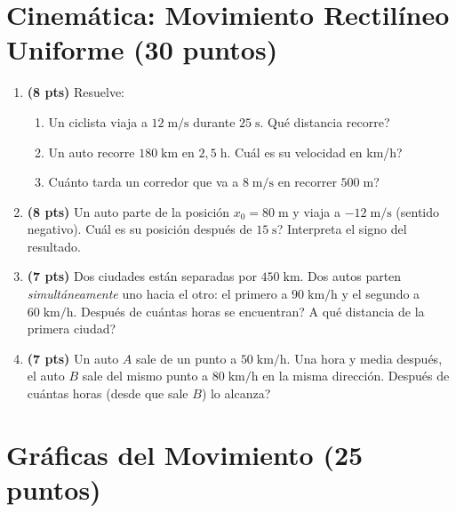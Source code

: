 \documentclass[12pt, letterpaper]{article}
\begin{document}
\newpage

\section{Cinemática: Movimiento Rectilíneo Uniforme (30 puntos)}

\begin{enumerate}[leftmargin=*]
  \item \textbf{(8 pts)} Resuelve:
        \begin{enumerate}[label=\alph*)]
          \item Un ciclista viaja a $12\;\text{m/s}$ durante $25\;\text{s}$. \textquestiondown Qué distancia recorre?
          \item Un auto recorre $180\;\text{km}$ en $2{,}5\;\text{h}$. \textquestiondown Cuál es su velocidad en km/h?
          \item \textquestiondown Cuánto tarda un corredor que va a $8\;\text{m/s}$ en recorrer $500\;\text{m}$?
        \end{enumerate}

  \item \textbf{(8 pts)} Un auto parte de la posición $x_0 = 80\;\text{m}$ y viaja a $-12\;\text{m/s}$ (sentido negativo). \textquestiondown Cuál es su posición después de $15\;\text{s}$? Interpreta el signo del resultado.

  \item \textbf{(7 pts)} Dos ciudades están separadas por $450\;\text{km}$. Dos autos parten \emph{simultáneamente} uno hacia el otro: el primero a $90\;\text{km/h}$ y el segundo a $60\;\text{km/h}$. \textquestiondown Después de cuántas horas se encuentran? \textquestiondown A qué distancia de la primera ciudad?

  \item \textbf{(7 pts)} Un auto $A$ sale de un punto a $50\;\text{km/h}$. Una hora y media después, el auto $B$ sale del mismo punto a $80\;\text{km/h}$ en la misma dirección. \textquestiondown Después de cuántas horas (desde que sale $B$) lo alcanza?
\end{enumerate}

\newpage

\section{Gráficas del Movimiento (25 puntos)}
\end{document}
